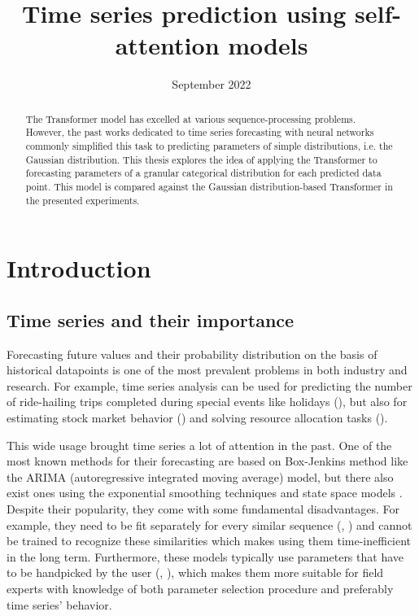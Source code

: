 \documentclass[en]{pracamgr}
\title{Time series prediction using self-attention models}
\date{September 2022}
\begin{document}
	\maketitle
	
	\begin{abstract}
		The Transformer model has excelled at various sequence-processing problems. However, the past works dedicated to time series forecasting with neural networks commonly simplified this task to predicting parameters of simple distributions, i.e. the Gaussian distribution. This thesis explores the idea of applying the Transformer to forecasting parameters of a granular categorical distribution for each predicted data point. This model is compared against the Gaussian distribution-based Transformer in the presented experiments.
		
	\end{abstract}
	
	\tableofcontents
	
	\chapter*{Introduction}
	
	\section*{Time series and their importance}\label{r:tsi}
	
	Forecasting future values and their probability distribution on the basis of historical datapoints is one of the most prevalent problems in both industry and research.
	For example, time series analysis can be used for predicting the number of ride-hailing trips completed during special events like holidays (\cite{uber}), but also for estimating stock market behavior (\cite{stock1}) and solving resource allocation tasks (\cite{graph-forecast}). 
	
	
	This wide usage brought time series a lot of attention in the past. One of the most known methods for their forecasting are based on Box-Jenkins method like the ARIMA (autoregressive integrated moving average) \cite{arima} model, but there also exist ones using the exponential smoothing techniques and state space models \cite{ssm}. Despite their popularity, they come with some fundamental disadvantages. For example, they need to be fit separately for every similar sequence (\cite{enhancing}, \cite{deepar}) and cannot be trained to recognize these similarities which makes using them time-inefficient in the long term.
	Furthermore, these models typically use parameters that have to be handpicked by the user (\cite{enhancing},
	\cite{deepar}), which makes them more suitable for field experts with knowledge of both parameter selection procedure and preferably time series' behavior.
	
\end{document}
